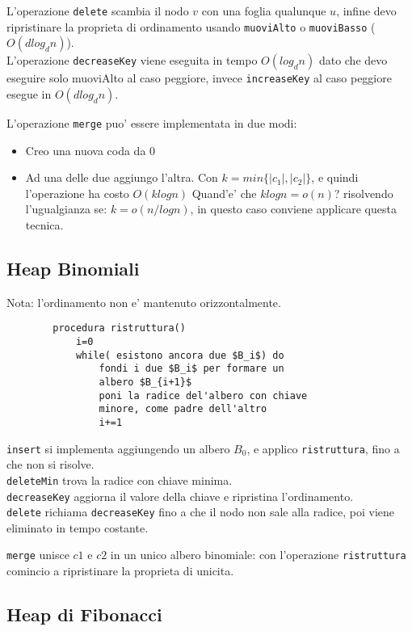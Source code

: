     L'operazione \texttt{delete} scambia  il nodo $v$ con una foglia qualunque $u$, infine devo ripristinare
    la proprieta di ordinamento usando \texttt{muoviAlto} o \texttt{muoviBasso} ($O(d log_d n)$).\\

    L'operazione \texttt{decreaseKey} viene eseguita in tempo $O(log_d n)$ dato che devo eseguire solo muoviAlto
    al caso peggiore, invece \texttt{increaseKey} al caso peggiore esegue in $O(d log_d n)$.

    L'operazione \texttt{merge} puo' essere implementata in due modi: 
    \begin{itemize}
        \item Creo una nuova coda da 0
        \item Ad una delle due aggiungo l'altra. Con $k=min\{ |c_1|, |c_2|\}$, e quindi l'operazione ha costo $O(k log n)$
        Quand'e' che $k log n = o(n)$? risolvendo l'ugualgianza se: $k = o(n/logn)$, in questo caso conviene applicare questa tecnica.
    \end{itemize}

\subsection{Heap Binomiali}
    Nota: l'ordinamento non e' mantenuto orizzontalmente. \\

    \begin{lstlisting}
        procedura ristruttura()
            i=0
            while( esistono ancora due $B_i$) do
                fondi i due $B_i$ per formare un 
                albero $B_{i+1}$
                poni la radice del'albero con chiave
                minore, come padre dell'altro
                i+=1
    \end{lstlisting}

    \texttt{insert} si implementa aggiungendo un albero $B_0$, e applico \texttt{ristruttura},
    fino a che non si risolve. \\

    \texttt{deleteMin} trova la radice con chiave minima. \\

    \texttt{decreaseKey} aggiorna il valore della chiave e ripristina l'ordinamento. \\

    \texttt{delete} richiama \texttt{decreaseKey} fino a che il nodo non sale alla radice, poi viene eliminato
    in tempo costante.

    \texttt{merge} unisce $c1$ e $c2$ in un unico albero binomiale: con l'operazione \texttt{ristruttura} comincio
    a ripristinare la proprieta di unicita.

\subsection{Heap di Fibonacci}
